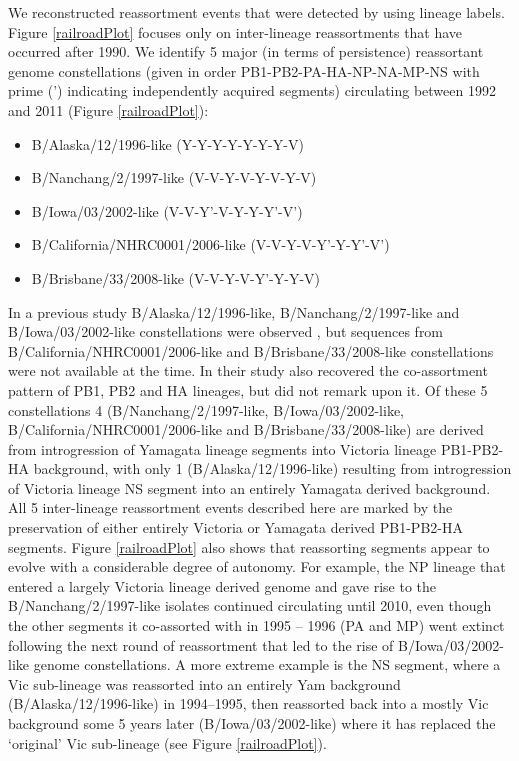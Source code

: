 \documentclass[11pt,oneside,letterpaper]{article}
\begin{document}
We reconstructed reassortment events that were detected by using lineage labels.
Figure \ref{railroadPlot} focuses only on inter-lineage reassortments that have occurred after 1990.
We identify 5 major (in terms of persistence) reassortant genome constellations (given in order PB1-PB2-PA-HA-NP-NA-MP-NS with prime (') indicating independently acquired segments) circulating between 1992 and 2011 (Figure \ref{railroadPlot}):
\begin{itemize}
  \item B/Alaska/12/1996-like (Y-Y-Y-Y-Y-Y-Y-V)
  \item B/Nanchang/2/1997-like (V-V-Y-V-Y-V-Y-V)
  \item B/Iowa/03/2002-like (V-V-Y'-V-Y-Y-Y'-V')
  \item B/California/NHRC0001/2006-like (V-V-Y-V-Y'-Y-Y'-V')
  \item B/Brisbane/33/2008-like (V-V-Y-V-Y'-Y-Y-V)
\end{itemize}
In a previous study B/Alaska/12/1996-like, B/Nanchang/2/1997-like and B/Iowa/03/2002-like constellations were observed \citet{chen2008}, but sequences from \\B/California/NHRC0001/2006-like and B/Brisbane/33/2008-like constellations were not available at the time.
In their study \citet{chen2008} also recovered the co-assortment pattern of PB1, PB2 and HA lineages, but did not remark upon it.
Of these 5 constellations 4 (B/Nanchang/2/1997-like, B/Iowa/03/2002-like,\\ B/California/NHRC0001/2006-like and B/Brisbane/33/2008-like) are derived from introgression of Yamagata lineage segments into Victoria lineage PB1-PB2-HA background, with only 1 (B/Alaska/12/1996-like) resulting from introgression of Victoria lineage NS segment into an entirely Yamagata derived background.
All 5 inter-lineage reassortment events described here are marked by the preservation of either entirely Victoria or Yamagata derived PB1-PB2-HA segments.
Figure \ref{railroadPlot} also shows that reassorting segments appear to evolve with a considerable degree of autonomy.
For example, the NP lineage that entered a largely Victoria lineage derived genome and gave rise to the B/Nanchang/2/1997-like isolates continued circulating until 2010, even though the other segments it co-assorted with in 1995 -- 1996 (PA and MP) went extinct following the next round of reassortment that led to the rise of B/Iowa/03/2002-like genome constellations.
A more extreme example is the NS segment, where a Vic sub-lineage was reassorted into an entirely Yam background (B/Alaska/12/1996-like) in 1994--1995, then reassorted back into a mostly Vic background some 5 years later (B/Iowa/03/2002-like) where it has replaced the `original' Vic sub-lineage (see Figure \ref{railroadPlot}).
\end{document}

